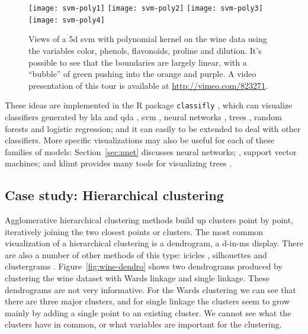 \documentclass[preprint]{imsart}
\begin{document}
\begin{figure}[htbp]
  \centering
    \texttt{[image: svm-poly1]}
    \texttt{[image: svm-poly2]}
    \texttt{[image: svm-poly3]}
    \texttt{[image: svm-poly4]}
  \caption{Views of a 5d {\sc svm} with polynomial kernel on the wine data using the variables color, phenols, flavonoids, proline and dilution.  It's possible to see that the boundaries are largely linear, with a ``bubble'' of green pushing into the orange and purple.  A video presentation of this tour is available at \url{http://vimeo.com/823271}.}
  \label{fig:svm-poly5}
\end{figure}

These ideas are implemented in the R package {\tt classifly} \citep{classifly}, which can visualize classifiers generated by {\sc lda} and {\sc qda} \citep{mass}, {\sc svm} \citep{e1071}, neural networks \citep{mass}, trees \citep{rpart}, random forests \citep{randomForest} and logistic regression; and it can easily to be extended to deal with other classifiers.  More specific visualizations may also be useful for each of these families of models: Section~\ref{sec:nnet} discusses neural networks; \citet{cook:2007}, support vector machines; and {\sc klimt} provides many tools for visualizing trees \citep{urbanek:2002,urbanek:2002a,urbanek:2003}.

\subsection{Case study: Hierarchical clustering}
\label{sub:hierarchical}

Agglomerative hierarchical clustering methods \citep{hartigan:1975a} build up clusters point by point, iteratively joining the two closest points or clusters. The most common visualization of a hierarchical clustering is a dendrogram, a d-in-ms display. There are also a number of other methods of this type: icicles \citep{kruskal:1983}, silhouettes \citep{trauwaert:1989} and clustergrams \citep{schonlau:2002}. Figure~\ref{fig:wine-dendro} shows two dendrograms produced by clustering the wine dataset with Wards linkage and single linkage. These dendrograms are not very informative. For the Wards clustering we can see that there are three major clusters, and for single linkage the clusters seem to grow mainly by adding a single point to an existing cluster. We cannot see what the clusters have in common, or what variables are important for the clustering.

\end{document}
